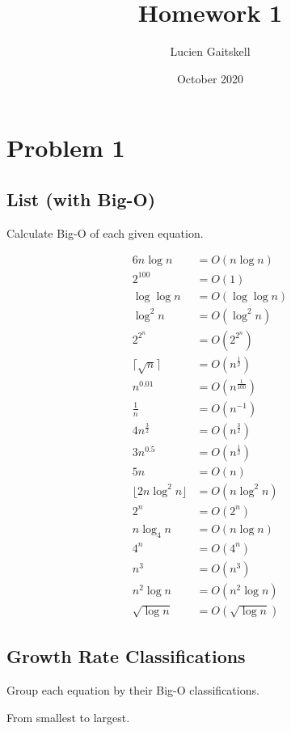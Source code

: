 \documentclass{article}
\title{Homework 1}
\author{Lucien Gaitskell}
\date{October 2020}
\begin{document}
\maketitle

\section{Problem 1}

\subsection{List (with Big-O)}

Calculate Big-O of each given equation.

\begin{align}
    6n\log n &= O(n\log n) \\
    2^{100} &= O(1) \\
    \log \log n &= O(\log \log n) \\
    \log^2 n &= O(\log^2 n) \\
    2^{2^{n}} &= O(2^{2^{n}}) \\
    \lceil \sqrt{n} \rceil &= O(n^{\frac{1}{2}}) \\
    n^{0.01} &= O(n^{\frac{1}{100}}) \\
    \frac{1}{n} &= O(n^{-1}) \\
    4n^{\frac{3}{2}} &= O(n^{\frac{3}{2}}) \\
    3n^{0.5} &= O(n^{\frac{1}{2}}) \\
    5n &= O(n)\\
    \lfloor 2n \log^2n \rfloor &= O(n \log^2n) \\
    2^n &= O(2^n) \\
    n \log_4 n &= O(n \log n) \\
    4^n &= O(4^n) \\
    n^3 &= O(n^3) \\
    n^2 \log n &= O(n^2 \log n) \\
    \sqrt{\log n} &= O(\sqrt{\log n})
\end{align}

\subsection{Growth Rate Classifications}

Group each equation by their Big-O classifications.

\begin{center}
    \small From smallest to largest.
\end{center}
\end{document}
